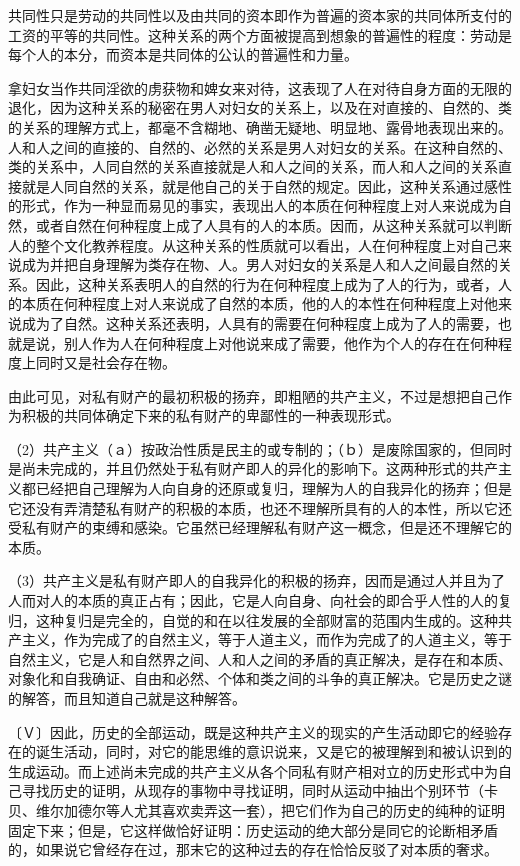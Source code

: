 \documentclass[a4paper,twoside,12pt]{ctexart}
\begin{document}
共同性只是劳动的共同性以及由共同的资本即作为普遍的资本家的共同体所支付的工资的平等的共同性。这种关系的两个方面被提高到想象的普遍性的程度：劳动是每个人的本分，而资本是共同体的公认的普遍性和力量。

拿妇女当作共同淫欲的虏获物和婢女来对待，这表现了人在对待自身方面的无限的退化，因为这种关系的秘密在男人对妇女的关系上，以及在对直接的、自然的、类的关系的理解方式上，都毫不含糊地、确凿无疑地、明显地、露骨地表现出来的。人和人之间的直接的、自然的、必然的关系是男人对妇女的关系。在这种自然的、类的关系中，人同自然的关系直接就是人和人之间的关系，而人和人之间的关系直接就是人同自然的关系，就是他自己的关于自然的规定。因此，这种关系通过感性的形式，作为一种显而易见的事实，表现出人的本质在何种程度上对人来说成为自然，或者自然在何种程度上成了人具有的人的本质。因而，从这种关系就可以判断人的整个文化教养程度。从这种关系的性质就可以看出，人在何种程度上对自己来说成为并把自身理解为类存在物、人。男人对妇女的关系是人和人之间最自然的关系。因此，这种关系表明人的自然的行为在何种程度上成为了人的行为，或者，人的本质在何种程度上对人来说成了自然的本质，他的人的本性在何种程度上对他来说成为了自然。这种关系还表明，人具有的需要在何种程度上成为了人的需要，也就是说，别人作为人在何种程度上对他说来成了需要，他作为个人的存在在何种程度上同时又是社会存在物。

由此可见，对私有财产的最初积极的扬弃，即粗陋的共产主义，不过是想把自己作为积极的共同体确定下来的私有财产的卑鄙性的一种表现形式。

（2）共产主义（ａ）按政治性质是民主的或专制的；（ｂ）是废除国家的，但同时是尚未完成的，并且仍然处于私有财产即人的异化的影响下。这两种形式的共产主义都已经把自己理解为人向自身的还原或复归，理解为人的自我异化的扬弃；但是它还没有弄清楚私有财产的积极的本质，也还不理解所具有的人的本性，所以它还受私有财产的束缚和感染。它虽然已经理解私有财产这一概念，但是还不理解它的本质。

（3）共产主义是私有财产即人的自我异化的积极的扬弃，因而是通过人并且为了人而对人的本质的真正占有；因此，它是人向自身、向社会的即合乎人性的人的复归，这种复归是完全的，自觉的和在以往发展的全部财富的范围内生成的。这种共产主义，作为完成了的自然主义，等于人道主义，而作为完成了的人道主义，等于自然主义，它是人和自然界之间、人和人之间的矛盾的真正解决，是存在和本质、对象化和自我确证、自由和必然、个体和类之间的斗争的真正解决。它是历史之谜的解答，而且知道自己就是这种解答。

〔Ｖ〕因此，历史的全部运动，既是这种共产主义的现实的产生活动即它的经验存在的诞生活动，同时，对它的能思维的意识说来，又是它的被理解到和被认识到的生成运动。而上述尚未完成的共产主义从各个同私有财产相对立的历史形式中为自己寻找历史的证明，从现存的事物中寻找证明，同时从运动中抽出个别环节（卡贝、维尔加德尔等人尤其喜欢卖弄这一套），把它们作为自己的历史的纯种的证明固定下来；但是，它这样做恰好证明：历史运动的绝大部分是同它的论断相矛盾的，如果说它曾经存在过，那末它的这种过去的存在恰恰反驳了对本质的奢求。
\end{document}
